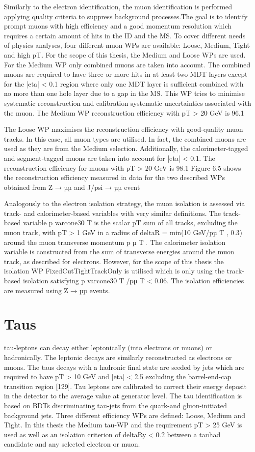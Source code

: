 Similarly to the electron identification, the muon identification is performed applying quality criteria
to suppress background processes.The goal is to identify prompt muons with high efficiency and a
good momentum resolution which requires a certain amount of hits in the ID and the MS. To cover
different needs of physics analyses, four different muon WPs are available: Loose, Medium, Tight
and high pT. For the scope of this thesis, the Medium and Loose WPs are used.
For the Medium WP only combined muons are taken into account. The combined muons are required
to have three or more hits in at least two MDT layers except for the |eta| < 0.1 region where only one
MDT layer is sufficient combined with no more than one hole layer due to a gap in the MS. This WP
tries to minimise systematic reconstruction and calibration systematic uncertainties associated with
the muon. The Medium WP reconstruction efficiency with pT > 20 GeV is 96.1%

The Loose WP maximises the reconstruction efficiency with good-quality muon tracks. In this case,
all muon types are utilised. In fact, the combined muons are used as they are from the Medium
selection. Additionally, the calorimeter-tagged and segment-tagged muons are taken into account for
|eta| < 0.1. The reconstruction efficiency for muons with pT > 20 GeV is 98.1%
Figure 6.5 shows the reconstruction efficiency measured in data for the two described WPs obtained
from Z → µµ and J/psi → µµ event

Analogously to the electron isolation strategy, the muon isolation is assessed via track- and calorimeter-based variables with very similar definitions. The track-based variable p
varcone30
T
is the scalar pT sum
of all tracks, excluding the muon track, with pT > 1 GeV in a radius of deltaR = min(10 GeV/pµ
T
, 0.3)
around the muon transverse momentum p
µ
T
. The calorimeter isolation variable is constructed from
the sum of transverse energies around the muon track, as described for electrons. However, for the
scope of this thesis the isolation WP FixedCutTightTrackOnly is utilised which is only using the
track-based isolation satisfying p
varcone30
T
/pµ
T < 0.06. The isolation efficiencies are measured using
Z → µµ events.

\section{Taus}

tau-leptons can decay either leptonically (into electrons or muons) or hadronically. The leptonic decays
are similarly reconstructed as electrons or muons. The taus decays with a hadronic final state are seeded
by jets which are required to have pT > 10 GeV and |eta| < 2.5 excluding the barrel-end-cap transition
region [129]. Tau leptons are calibrated to correct their energy deposit in the detector to the average
value at generator level. The tau identification is based on BDTs discriminating tau-jets from the quark-and gluon-initiated background jets. Three different efficiency WPs are defined: Loose, Medium
and Tight. In this thesis the Medium tau-WP and the requirement pT > 25 GeV is used as well as an
isolation criterion of deltaRy < 0.2 between a tauhad candidate and any selected electron or muon.

